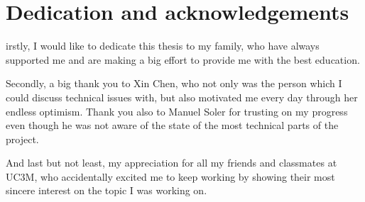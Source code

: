 
\chapter*{Dedication and acknowledgements}
\begin{SingleSpace}
irstly, I would like to dedicate this thesis to my family, who have always supported me and are making a big effort to provide me with the best education.

\hspace{2em}  Secondly, a big thank you to Xin Chen, who not only was the person which I could discuss technical issues with, but also motivated me every day through her endless optimism.
Thank you also to Manuel Soler for trusting on my progress even though he was not aware of the state of the most technical parts of the project.

And last but not least, my appreciation for all my friends and classmates at UC3M, who accidentally excited me to keep working by showing their most sincere interest on the topic I was working on.
\end{SingleSpace}
\clearpage
